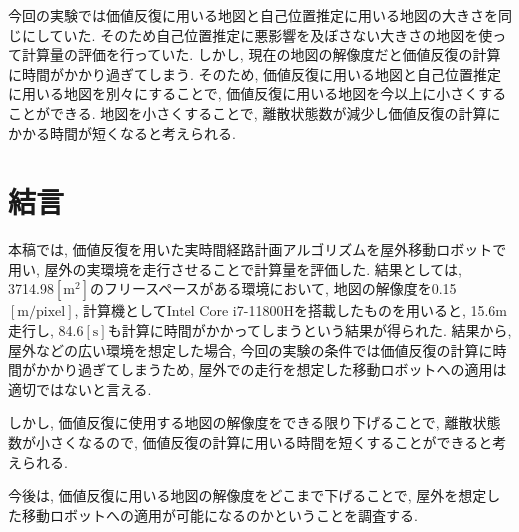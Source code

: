 \documentclass{jarticle}
\begin{document}
今回の実験では価値反復に用いる地図と自己位置推定に用いる地図の大きさを同じにしていた. 
そのため自己位置推定に悪影響を及ぼさない大きさの地図を使って計算量の評価を行っていた. 
しかし, 現在の地図の解像度だと価値反復の計算に時間がかかり過ぎてしまう. 
そのため, 価値反復に用いる地図と自己位置推定に用いる地図を別々にすることで, 価値反復に用いる地図を今以上に小さくすることができる. 
地図を小さくすることで, 離散状態数が減少し価値反復の計算にかかる時間が短くなると考えられる. 
\section{結言}%
本稿では, 価値反復を用いた実時間経路計画アルゴリズムを屋外移動ロボットで用い, 屋外の実環境を走行させることで計算量を評価した. 
結果としては, 3714.98$\mathrm{[m^2]}$のフリースペースがある環境において, 
地図の解像度を0.15$\mathrm{[m/pixel]}$, 計算機としてIntel Core i7-11800Hを搭載したものを用いると, 
15.6$\mathrm{m}$走行し, 84.6$\mathrm{[s]}$も計算に時間がかかってしまうという結果が得られた. 
結果から, 屋外などの広い環境を想定した場合, 今回の実験の条件では価値反復の計算に時間がかかり過ぎてしまうため, 
屋外での走行を想定した移動ロボットへの適用は適切ではないと言える.

しかし, 価値反復に使用する地図の解像度をできる限り下げることで, 
離散状態数が小さくなるので, 価値反復の計算に用いる時間を短くすることができると考えられる.

今後は, 価値反復に用いる地図の解像度をどこまで下げることで, 
屋外を想定した移動ロボットへの適用が可能になるのかということを調査する. 
\end{document}
